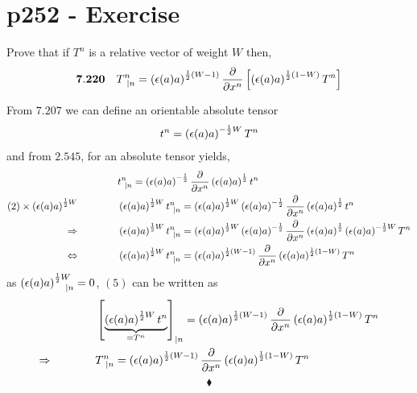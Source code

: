 \section{p252 - Exercise }
\begin{tcolorbox}
Prove that if $T^n$ is a relative vector of weight $W$ then,
$$\mathbf{7.220} \quad T^n_{\ |n}= \left(\epsilon(a)a\right)^{\frac{1}{2}(W-1)}\pdv{}{x^n}\left[\left(\epsilon(a)a\right)^{\frac{1}{2}(1-W)}T^n\right]$$ 
\end{tcolorbox}
From $\mathbf{7.207}$ we can define an orientable absolute tensor
\begin{align}
t^n= \left(\epsilon(a)a\right)^{-\frac{1}{2} W}T^n
\end{align}
and from $\mathbf{2.545}$, for an absolute tensor yields,
\begin{align}
& t^n_{\ |n} = \left(\epsilon(a)a\right)^{-\half }\pdv{}{x^n} \left(\epsilon(a)a\right)^{\half }t^n\\
(2) \times \left(\epsilon(a)a\right)^{\half W}\spatie 
&\left(\epsilon(a)a\right)^{\half W}t^n_{\ |n} = \left(\epsilon(a)a\right)^{\half W}\left(\epsilon(a)a\right)^{-\half }\pdv{}{x^n} \left(\epsilon(a)a\right)^{\half }t^n\\
\Rightarrow \spatie &\left(\epsilon(a)a\right)^{\half W}t^n_{\ |n} = \left(\epsilon(a)a\right)^{\half W}\left(\epsilon(a)a\right)^{-\half }\pdv{}{x^n} \left(\epsilon(a)a\right)^{\half }\left(\epsilon(a)a\right)^{-\half W}T^n\\
\Leftrightarrow \spatie &\left(\epsilon(a)a\right)^{\half W}t^n_{\ |n} = \left(\epsilon(a)a\right)^{\half (W-1)}\pdv{}{x^n} \left(\epsilon(a)a\right)^{\half (1-W) }T^n
\end{align}
as $ \left(\epsilon(a)a\right)^{\half W}_{\ \ \ |n}=0$, $(5)$ can be written as 
\begin{align}
&\left[\underbrace{\left(\epsilon(a)a\right)^{\frac{1}{2} W}t^n}_{= T^n}\right]_{|n} = \left(\epsilon(a)a\right)^{\frac{1}{2} (W-1)}\pdv{}{x^n} \left(\epsilon(a)a\right)^{\frac{1}{2} (1-W) }T^n\\
\Rightarrow \quad\quad\quad\quad &T^n_{\ |n} = \left(\epsilon(a)a\right)^{\frac{1}{2} (W-1)}\pdv{}{x^n} \left(\epsilon(a)a\right)^{\frac{1}{2} (1-W) }T^n
\end{align}
$$\blacklozenge$$
\newpage




